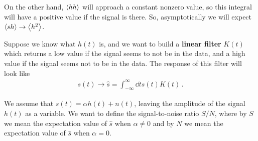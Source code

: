 \documentclass[main.tex]{subfiles}
\begin{document}
On the other hand, \(\expval{hh}\) will approach a constant nonzero value, so this integral will have a positive value if the signal is there.
So, asymptotically we will expect \(\expval{sh} \to \expval{h^2}\).

Suppose we know what \(h(t)\) is, and we want to build a \textbf{linear filter} \(K(t)\) which returns a low value if the signal seems to not be in the data, and a high value if the signal seems not to be in the data.
The response of this filter will look like 
%
\begin{align}
s(t) \to \hat{s} = \int_{- \infty}^{\infty } \dd{t} s(t) K(t)
\,.
\end{align}

We assume that \(s(t) = \alpha h(t) + n(t)\), leaving the amplitude of the signal \(h(t)\) as a variable. 
We want to define the signal-to-noise ratio \(S / N\), where by \(S\) we mean the expectation value of \(\hat{s}\) when \(\alpha \neq 0\) and by \(N\) we mean the expectation value of \(\hat{s}\) when \(\alpha = 0\).
\end{document}
